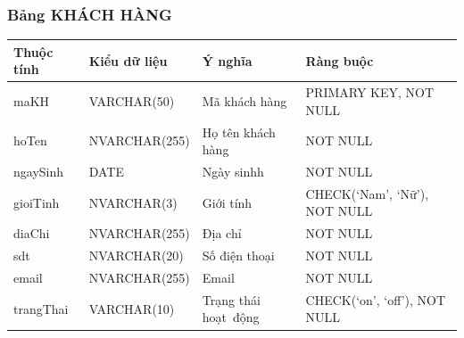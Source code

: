 \documentclass[a4paper,12pt]{report}
\begin{document}
\subsubsection{Bảng KHÁCH HÀNG}
\noindent
\begin{center}
    \begin{longtable}{|>{\centering\arraybackslash}p{3cm}|
        >{\centering\arraybackslash}p{4cm}|
        >{\centering\arraybackslash}p{4cm}|
        >{\centering\arraybackslash}p{4cm}|}
        \hline
        \textbf{Thuộc tính}                                                                                                               &
        \textbf{Kiểu dữ liệu}                                                                                                                             &
        \textbf{Ý nghĩa}                                                                                                 &
        \textbf{Ràng buộc}                                                                                                         \\
        \hline
        maKH &  VARCHAR(50)  & Mã khách hàng & PRIMARY KEY, NOT NULL \\
        \hline
        hoTen &  NVARCHAR(255)  & Họ tên khách hàng & NOT NULL \\                                                                                                                          
        \hline
        ngaySinh & DATE & Ngày sinhh & NOT NULL \\                                                                                                                          
        \hline
        gioiTinh & NVARCHAR(3) & Giới tính & CHECK(‘Nam’, ‘Nữ’), NOT NULL \\                                                                                                                          
        \hline
        diaChi & NVARCHAR(255) & Địa chỉ & NOT NULL \\                                                                                                                          
        \hline
        sdt & NVARCHAR(20) & Số điện thoại & NOT NULL \\                                                                                                                          
        \hline
        email & NVARCHAR(255) & Email & NOT NULL \\                                                                                                                          
        \hline
        trangThai &  VARCHAR(10)  & Trạng thái hoạt~động & CHECK(‘on’, ‘off’), NOT NULL \\
        \hline
    \end{longtable}
\end{center}
\end{document}
